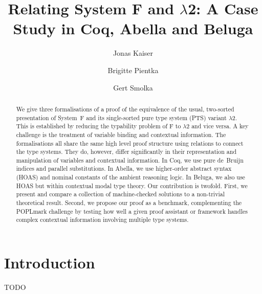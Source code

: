 \documentclass[a4paper,UKenglish]{lipics-v2016}
\title{Relating System F and $\lambda$2: A Case Study in Coq, Abella and Beluga}
\author[1]{Jonas Kaiser}
\author[2]{Brigitte Pientka}
\author[1]{Gert Smolka}
\affil[1]{Saarland University, Saarbrücken, Germany\\
  \texttt{\{jkaiser,smolka\}}@ps.uni-saarland.de}
\affil[2]{School of Computer Science, Montreal, Canada\\
  \texttt{bpientka@cs.mcgill.ca}}
\newcommand{\SysL}{$\lambda$2\xspace}
\begin{document}
\maketitle

\begin{abstract}
  We give three formalisations of a proof of the equivalence of the usual, two-sorted presentation of System~F and its single-sorted pure type system (PTS) variant \SysL.
  This is established by reducing the typability problem of F to \SysL and vice versa.
  A key challenge is the treatment of variable binding and contextual information.
  The formalisations all share the same high level proof structure using relations to connect the type systems.
  They do, however, differ significantly in their representation and manipulation of variables and contextual information.
  In Coq, we use pure de~Bruijn indices and parallel substitutions.
  In Abella, we use higher-order abstract syntax (HOAS) and nominal constants of the ambient reasoning logic.
  In Beluga, we also use HOAS but within contextual modal type theory.
  Our contribution is twofold.
  First, we present and compare a collection of machine-checked solutions to a non-trivial theoretical result.
  Second, we propose our proof as a benchmark, complementing the POPLmark challenge by testing how well a given proof assistant or framework handles complex contextual information involving multiple type systems.
\end{abstract}

\section{Introduction}

TODO
\end{document}
